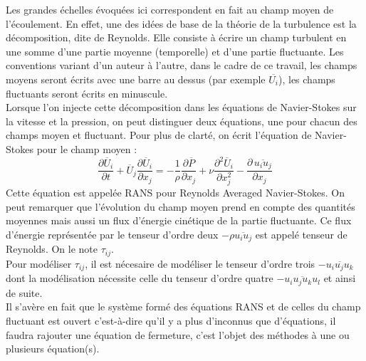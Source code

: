 \documentclass[a4paper,12pt]{article}
\newcommand{\cad}{c'est-à-dire}
\newcommand{\NS}{Navier-Stokes}
\numberwithin{equation}{section} %
\begin{document}
\noindent Les grandes échelles évoquées ici correspondent en fait au champ moyen de l'écoulement. En effet, une des idées de base de la théorie de la turbulence est la décomposition, dite de Reynolds. Elle consiste à écrire un champ turbulent en une somme d'une partie moyenne (temporelle) et d'une partie fluctuante. Les conventions variant d'un auteur à l'autre, dans le cadre de ce travail, les champs moyens seront écrits avec une barre au dessus (par exemple $\overline{U_i}$), les champs fluctuants seront écrits en minuscule. \\
Lorsque l'on injecte cette décomposition dans les équations de \NS $ $ sur la vitesse et la pression, on peut distinguer deux équations, une pour chacun des champs moyen et fluctuant. Pour plus de clarté, on écrit l'équation de \NS $ $ pour le champ moyen : 
\begin{equation}
 \frac{\partial \overline{U}_i}{\partial t} + \overline{U}_j \frac{\partial \overline{U}_i}{\partial x_j} = -\frac{1}{\rho} \frac{\partial \overline{P}}{\partial x_j} + \nu \frac{\partial^2 \overline{U}_i}{\partial x_j^2}  - \frac{\partial \, \overline{u_iu_j}}{\partial x_j} \label{meanfield}
 \end{equation}
  Cette équation est appelée RANS pour Reynolds Averaged \NS. On peut remarquer que l'évolution du champ moyen prend en compte des quantités moyennes mais aussi un flux d'énergie cinétique de la partie fluctuante. Ce flux d'énergie représentée par le tenseur d'ordre deux $-\rho \overline{u_iu_j}$ est appelé tenseur de Reynolds. On le note $\tau_{ij}$.\\
Pour modéliser $\tau_{ij}$, il est nécesaire de modéliser le tenseur d'ordre trois $-\overline{u_iu_ju_k}$ dont la modélisation nécessite celle du tenseur d'ordre quatre $-\overline{u_iu_ju_ku_l}$ et ainsi de suite. \\
  Il s'avère en fait que le système formé des équations RANS et de celles du champ fluctuant est ouvert \cad $ $ qu'il y a plus d'inconnus que d'équations, il faudra rajouter une équation de fermeture, c'est l'objet des méthodes à une ou plusieurs équation(s).\\ %
  
\end{document}
